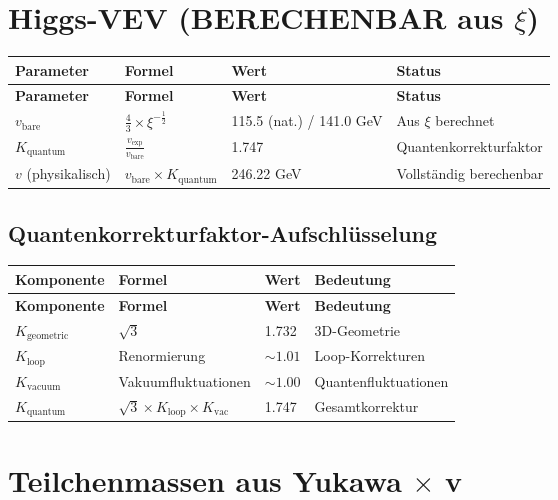 \documentclass[12pt,a4paper]{article}
\begin{document}
	\section{Higgs-VEV (BERECHENBAR aus \(\xi\))}
	
	\begin{longtable}{|p{3cm}|p{4cm}|p{3cm}|p{4cm}|}
		\hline
		\textbf{Parameter} & \textbf{Formel} & \textbf{Wert} & \textbf{Status} \\
		\hline
		\endfirsthead
		\hline
		\textbf{Parameter} & \textbf{Formel} & \textbf{Wert} & \textbf{Status} \\
		\hline
		\endhead
		\(v_{\text{bare}}\) & \(\frac{4}{3} \times \xi^{-\frac{1}{2}}\) & 115.5 (nat.) / 141.0 GeV & Aus \(\xi\) berechnet \\
		\hline
		\(K_{\text{quantum}}\) & \(\frac{v_{\text{exp}}}{v_{\text{bare}}}\) & 1.747 & Quantenkorrekturfaktor \\
		\hline
		\(v\) (physikalisch) & \(v_{\text{bare}} \times K_{\text{quantum}}\) & 246.22 GeV & Vollständig berechenbar \\
		\hline
	\end{longtable}
	
	\subsection{Quantenkorrekturfaktor-Aufschlüsselung}
	
	\begin{longtable}{|p{3cm}|p{4cm}|p{3cm}|p{4cm}|}
		\hline
		\textbf{Komponente} & \textbf{Formel} & \textbf{Wert} & \textbf{Bedeutung} \\
		\hline
		\endfirsthead
		\hline
		\textbf{Komponente} & \textbf{Formel} & \textbf{Wert} & \textbf{Bedeutung} \\
		\hline
		\endhead
		\(K_{\text{geometric}}\) & \(\sqrt{3}\) & 1.732 & 3D-Geometrie \\
		\hline
		\(K_{\text{loop}}\) & Renormierung & \(\sim 1.01\) & Loop-Korrekturen \\
		\hline
		\(K_{\text{vacuum}}\) & Vakuumfluktuationen & \(\sim 1.00\) & Quantenfluktuationen \\
		\hline
		\(K_{\text{quantum}}\) & \(\sqrt{3} \times K_{\text{loop}} \times K_{\text{vac}}\) & 1.747 & Gesamtkorrektur \\
		\hline
	\end{longtable}
	
	\section{Teilchenmassen aus Yukawa \(\times\) v}
	
\end{document}
